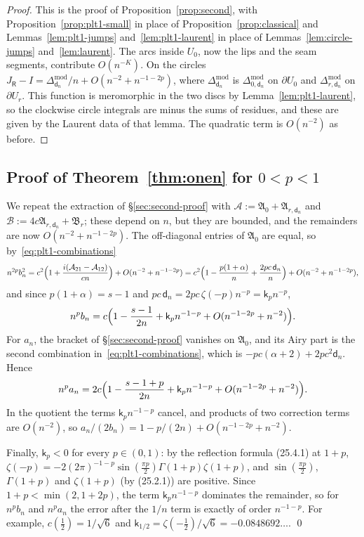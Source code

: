 \begin{proof}
This is the proof of Proposition~\ref{prop:second}, with Proposition~\ref{prop:plt1-small} in place of
Proposition~\ref{prop:classical} and Lemmas~\ref{lem:plt1-jumps} and~\ref{lem:plt1-laurent} in place of
Lemmas~\ref{lem:circle-jumps} and~\ref{lem:laurent}. The arcs inside $U_0$, now the lips and the seam segments, contribute
$O(n^{-K})$. On the circles $J_{\mathsf R}-I=\Delta^{\mathrm{mod}}_{\mathsf d_n}/n+O(n^{-2}+n^{-1-2p})$, where
$\Delta^{\mathrm{mod}}_{\mathsf d_n}$ is $\Delta^{\mathrm{mod}}_{0,\mathsf d_n}$ on $\partial U_0$ and $\Delta^{\mathrm{mod}}_{r,\mathsf d_n}$
on $\partial U_r$. This function is meromorphic in the two discs by Lemma~\ref{lem:plt1-laurent}, so the clockwise
circle integrals are minus the sums of residues, and these are given by the Laurent data of that lemma. The quadratic
term is $O(n^{-2})$ as before.
\end{proof}

\subsection{\texorpdfstring{Proof of Theorem~\ref{thm:onen} for $0<p<1$}{Proof of Theorem 1.4 for 0<p<1}}\label{sec:plt1-proof}

We repeat the extraction of \S\ref{sec:second-proof} with $\mathcal A:=\mathfrak A_0+\mathfrak A_{r,\mathsf d_n}$ and
$\mathcal B:=4c\mathfrak A_{r,\mathsf d_n}+\mathfrak B_r$; these depend on $n$, but they are bounded, and the remainders
are now $O(n^{-2}+n^{-1-2p})$. The off-diagonal entries of $\mathfrak A_0$ are equal, so by~\eqref{eq:plt1-combinations}
\[
  n^{2p}b_n^2=c^2\Bigl(1+\frac{i(\mathcal A_{21}-\mathcal A_{12})}{cn}\Bigr)+O(n^{-2}+n^{-1-2p})
  =c^2\Bigl(1-\frac{p(1+\alpha)}n+\frac{2pc\,\mathsf d_n}n\Bigr)+O(n^{-2}+n^{-1-2p}),
\]
and since $p(1+\alpha)=s-1$ and $pc\,\mathsf d_n=2pc\,\zeta(-p)n^{-p}=\mathsf k_pn^{-p}$,
\[
  n^pb_n=c\Bigl(1-\frac{s-1}{2n}+\mathsf k_pn^{-1-p}+O(n^{-1-2p}+n^{-2})\Bigr).
\]
For $a_n$, the bracket of \S\ref{sec:second-proof} vanishes on $\mathfrak A_0$, and its Airy part is the second
combination in~\eqref{eq:plt1-combinations}, which is $-pc(\alpha+2)+2pc^2\mathsf d_n$. Hence
\[
  n^pa_n=2c\Bigl(1-\frac{s-1+p}{2n}+\mathsf k_pn^{-1-p}+O(n^{-1-2p}+n^{-2})\Bigr).
\]
In the quotient the terms $\mathsf k_pn^{-1-p}$ cancel, and products of two correction terms are
$O(n^{-2})$, so $a_n/(2b_n)=1-p/(2n)+O(n^{-1-2p}+n^{-2})$.

Finally, $\mathsf k_p<0$ for every $p\in(0,1)$: by the reflection formula (25.4.1) at $1+p$,
$\zeta(-p)=-2(2\pi)^{-1-p}\sin(\frac{\pi p}2)\Gamma(1+p)\zeta(1+p)$, and $\sin(\frac{\pi p}2)$, $\Gamma(1+p)$ and
$\zeta(1+p)$ (by (25.2.1)) are positive. Since $1+p<\min(2,1+2p)$, the term $\mathsf k_pn^{-1-p}$ dominates the
remainder, so for $n^pb_n$ and $n^pa_n$ the error after the $1/n$ term is exactly of order $n^{-1-p}$. For example,
$c(\frac12)=1/\sqrt6$ and $\mathsf k_{1/2}=\zeta(-\frac12)/\sqrt6=-0.0848692\ldots$.
\qed

